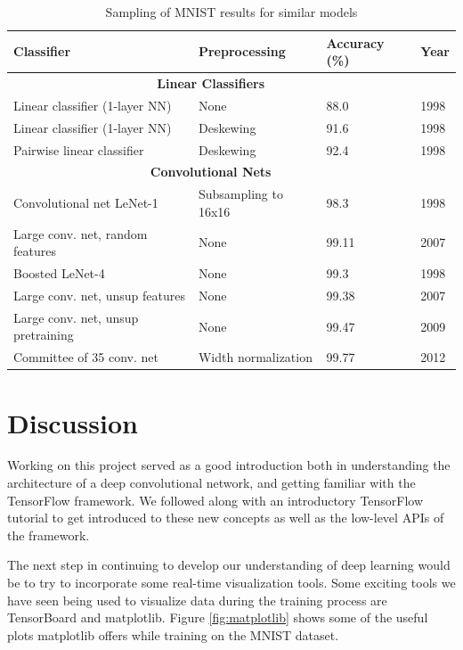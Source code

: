\documentclass{article}
\begin{document}
\begin{table}[h]
	\caption{Sampling of MNIST results for similar models}
	\centering
	\begin{tabular}{llll}
        \toprule
        Classifier & Preprocessing & Accuracy (\%) & Year \\
        \midrule
        \multicolumn{3}{c}{\textbf{Linear Classifiers}} \\
		\midrule
        Linear classifier (1-layer NN) \cite{lecun-98} & None & 88.0 & 1998 \\
        Linear classifier (1-layer NN) \cite{lecun-98} & Deskewing & 91.6 & 1998 \\
        Pairwise linear classifier \cite{lecun-98} & Deskewing & 92.4 & 1998 \\
        \midrule
        \multicolumn{3}{c}{\textbf{Convolutional Nets}} \\
		\midrule
        Convolutional net LeNet-1 \cite{lecun-98} & Subsampling to 16x16 & 98.3 & 1998 \\
        Large conv. net, random features \cite{ranzato-cvpr-07} & None & 99.11 & 2007 \\
        Boosted LeNet-4 \cite{lecun-98} & None & 99.3 & 1998 \\
        Large conv. net, unsup features  \cite{ranzato-cvpr-07} & None & 99.38 & 2007 \\
        Large conv. net, unsup pretraining \cite{jarrett-iccv-09} & None & 99.47 & 2009 \\
        Committee of 35 conv. net \cite{DBLP:journals/corr/abs-1202-2745} & Width normalization & 99.77 & 2012 \\
		\bottomrule
	\end{tabular}
    \label{table:results}
\end{table}

\section{Discussion}

Working on this project served as a good introduction both in understanding the architecture of a deep convolutional network, and getting familiar with the TensorFlow framework. We followed along with an introductory TensorFlow tutorial to get introduced to these new concepts as well as the low-level APIs of the framework.

The next step in continuing to develop our understanding of deep learning would 
be to try to incorporate some real-time visualization tools. Some exciting 
tools we have seen being used to visualize data during the training process are TensorBoard and matplotlib. Figure \ref{fig:matplotlib} shows some of the useful plots matplotlib offers while training on the MNIST dataset.
\end{document}
